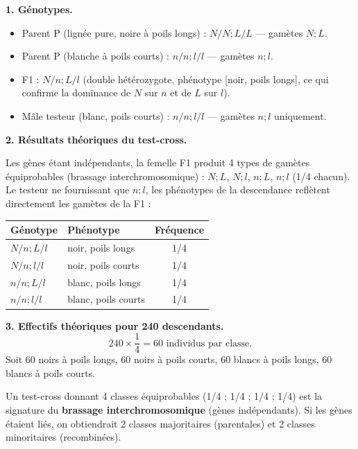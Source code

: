 \documentclass[11pt]{article}
\begin{document}
\begin{corrige}
\textbf{1. Génotypes.}
\begin{itemize}
    \item Parent P (lignée pure, noire à poils longs) : $N/N ; L/L$ — gamètes $N;L$.
    \item Parent P (blanche à poils courts) : $n/n ; l/l$ — gamètes $n;l$.
    \item F1 : $N/n ; L/l$ (double hétérozygote, phénotype [noir, poils longs], ce qui confirme la dominance de $N$ sur $n$ et de $L$ sur $l$).
    \item Mâle testeur (blanc, poils courts) : $n/n ; l/l$ — gamètes $n;l$ uniquement.
\end{itemize}

\textbf{2. Résultats théoriques du test-cross.}

Les gènes étant indépendants, la femelle F1 produit 4 types de gamètes équiprobables (brassage interchromosomique) : $N;L$, $N;l$, $n;L$, $n;l$ (1/4 chacun). Le testeur ne fournissant que $n;l$, les phénotypes de la descendance reflètent directement les gamètes de la F1 :

\begin{center}
\begin{tabular}{|l|l|c|}\hline
\rowcolor{popblueL} Génotype & Phénotype & Fréquence \\ \hline
$N/n ; L/l$ & noir, poils longs & 1/4 \\
$N/n ; l/l$ & noir, poils courts & 1/4 \\
$n/n ; L/l$ & blanc, poils longs & 1/4 \\
$n/n ; l/l$ & blanc, poils courts & 1/4 \\ \hline
\end{tabular}
\end{center}

\textbf{3. Effectifs théoriques pour 240 descendants.}
\[ 240 \times \frac{1}{4} = 60 \text{ individus par classe}. \]
Soit 60 noirs à poils longs, 60 noirs à poils courts, 60 blancs à poils longs, 60 blancs à poils courts.

\begin{attention}
Un test-cross donnant 4 classes équiprobables (1/4 ; 1/4 ; 1/4 ; 1/4) est la signature du \textbf{brassage interchromosomique} (gènes indépendants). Si les gènes étaient liés, on obtiendrait 2 classes majoritaires (parentales) et 2 classes minoritaires (recombinées).
\end{attention}
\end{corrige}
\end{document}
